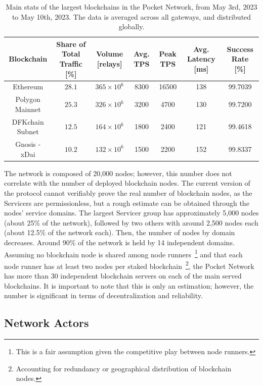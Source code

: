 \documentclass[runningheads]{llncs}
\begin{document}
\begin{table}
    \caption{Main stats of the largest blockchains in the Pocket Network, from May 3rd, 2023 to May 10th, 2023. The data is averaged across all gateways, and distributed globally.}
    \label{tab:stats-pokt}
    \begin{tabularx}{\textwidth}{|C|C|C|C|C|C|C|}
        \hline Blockchain &  Share of Total Traffic [\%] & Volume [relays] & Avg. TPS & Peak TPS & Avg. Latency [ms] & Success Rate [\%] \\
        \hline
            Ethereum        &  $28.1$ & $365\times 10^6$ &  8300 &  16500 &  138 & 99.7039  \\
            Polygon Mainnet &  $25.3$ & $326\times 10^6$ &  3200 &   4700 &  130 & 99.7200 \\
            DFKchain Subnet &  $12.5$ & $164\times 10^6$ &  1800 &   2400 &  121 & 99.4618 \\
            Gnosis - xDai   &  $10.2$ & $132\times 10^6$ &  1500 &   2200 &  152 & 99.8337 \\
        \hline
    \end{tabularx}
\end{table}

The network is composed of 20,000 nodes; however, this number does not correlate with the number of deployed blockchain nodes. The current version of the protocol cannot verifiably prove the real number of blockchain nodes, as the Servicers are permissionless, but a rough estimate can be obtained through the nodes' service domains. The largest Servicer group has approximately 5,000 nodes (about 25\% of the network), followed by two others with around 2,500 nodes each (about 12.5\% of the network each). Then, the number of nodes by domain decreases. Around 90\% of the network is held by 14 independent domains. Assuming no blockchain node is shared among node runners~\footnote{This is a fair assumption given the competitive play between node runners.} and that each node runner has at least two nodes per staked blockchain~\footnote{Accounting for redundancy or geographical distribution of blockchain nodes.}, the Pocket Network has more than 30 independent blockchain servers on each of the main served blockchains. It is important to note that this is only an estimation; however, the number is significant in terms of decentralization and reliability.

\subsection{Network Actors}
\end{document}
